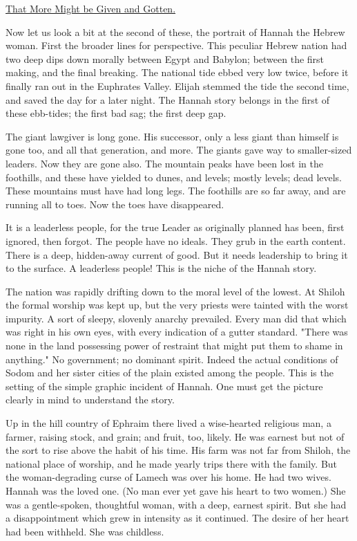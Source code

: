 \underline{That More Might be Given and Gotten.}


Now let us look a bit at the second of these, the portrait of Hannah the
Hebrew woman. First the broader lines for perspective. This peculiar
Hebrew nation had two deep dips down morally between Egypt and Babylon;
between the first making, and the final breaking. The national tide ebbed
very low twice, before it finally ran out in the Euphrates Valley. Elijah
stemmed the tide the second time, and saved the day for a later night. The
Hannah story belongs in the first of these ebb-tides; the first bad sag;
the first deep gap.

The giant lawgiver is long gone. His successor, only a less giant than
himself is gone too, and all that generation, and more. The giants gave
way to smaller-sized leaders. Now they are gone also. The mountain peaks
have been lost in the foothills, and these have yielded to dunes, and
levels; mostly levels; dead levels. These mountains must have had long
legs. The foothills are so far away, and are running all to toes. Now the
toes have disappeared.

It is a leaderless people, for the true Leader as originally planned has
been, first ignored, then forgot. The people have no ideals. They grub in
the earth content. There is a deep, hidden-away current of good. But it
needs leadership to bring it to the surface. A leaderless people! This is
the niche of the Hannah story.

The nation was rapidly drifting down to the moral level of the lowest. At
Shiloh the formal worship was kept up, but the very priests were tainted
with the worst impurity. A sort of sleepy, slovenly anarchy prevailed.
Every man did that which was right in his own eyes, with every indication
of a gutter standard. "There was none in the land possessing power of
restraint that might put them to shame in anything." No government; no
dominant spirit. Indeed the actual conditions of Sodom and her sister
cities of the plain existed among the people. This is the setting of the
simple graphic incident of Hannah. One must get the picture clearly in
mind to understand the story.

Up in the hill country of Ephraim there lived a wise-hearted religious
man, a farmer, raising stock, and grain; and fruit, too, likely. He was
earnest but not of the sort to rise above the habit of his time. His farm
was not far from Shiloh, the national place of worship, and he made yearly
trips there with the family. But the woman-degrading curse of Lamech was
over his home. He had two wives. Hannah was the loved one. (No man ever
yet gave his heart to two women.) She was a gentle-spoken, thoughtful
woman, with a deep, earnest spirit. But she had a disappointment which
grew in intensity as it continued. The desire of her heart had been
withheld. She was childless.

